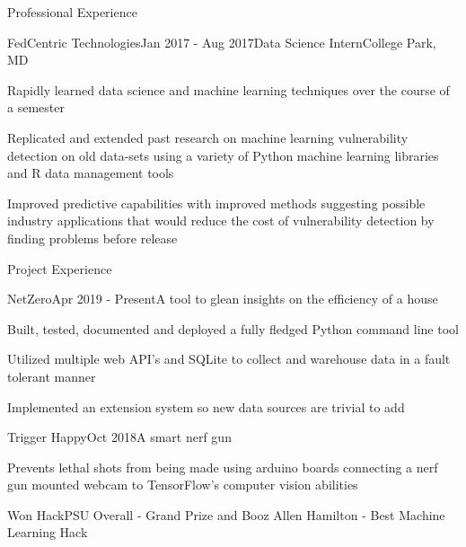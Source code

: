 \documentclass{resume} %
\begin{document}
\begin{rSection}{Professional Experience}

\begin{rSubsection}{FedCentric Technologies}{Jan 2017 - Aug 2017}{Data Science Intern}{College Park, MD}
\item Rapidly learned data science and machine learning techniques over the course of a semester
\item Replicated and extended past research on machine learning vulnerability detection on old data-sets using a variety of Python machine learning libraries and R data management tools
\item Improved predictive capabilities with improved methods suggesting possible industry applications that would reduce the cost of vulnerability detection by finding problems before release
\end{rSubsection}


\end{rSection}

\begin{rSection}{Project Experience}

\begin{rSubsection}{NetZero}{Apr 2019 - Present}{A tool to glean insights on the efficiency of a house}{}
\item Built, tested, documented and deployed a fully fledged Python command line tool
\item Utilized multiple web API's and SQLite to collect and warehouse data in a fault tolerant manner
\item Implemented an extension system so new data sources are trivial to add
\end{rSubsection}

\begin{rSubsection}{Trigger Happy}{Oct 2018}{A smart nerf gun}{}
\item Prevents lethal shots from being made using arduino boards connecting a nerf gun mounted webcam to TensorFlow's computer vision abilities
\item Won HackPSU Overall - Grand Prize and Booz Allen Hamilton - Best Machine Learning Hack
\end{rSubsection}

\end{rSection}
\end{document}
